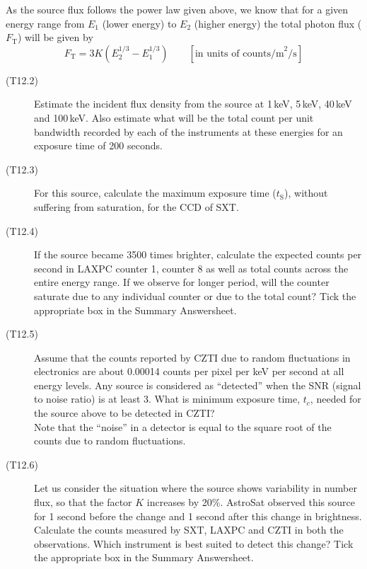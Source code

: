 As the source flux follows the power law given above, we know that for a given
energy range from $E_1$ (lower energy) to $E_2$ (higher energy) the total
photon flux ($F_{\mathrm{T}}$) will be given by
\[ F_{\mathrm{T}} = 3K\left(E_2^{1/3} - E_1^{1/3}\right) \qquad
   [\text{in units of counts/m}^2\text{/s}] \]

\begin{description}
\item[(T12.2)] Estimate the incident flux density from the source at 1\,keV,
  5\,keV, 40\,keV and 100\,keV. Also estimate what will be the total count per
  unit bandwidth recorded by each of the instruments at these energies for an
  exposure time of 200 seconds.
\item[(T12.3)] For this source, calculate the maximum exposure time
  ($t_{\mathrm{S}}$), without suffering from saturation, for the CCD of SXT.
\item[(T12.4)] If the source became 3500 times brighter, calculate the expected
  counts per second in LAXPC counter 1, counter 8 as well as total counts
  across the entire energy range. If we observe for longer period, will the
  counter saturate due to any individual counter or due to the total count?
  Tick the appropriate box in the Summary Answersheet.
\item[(T12.5)] Assume that the counts reported by CZTI due to random
  fluctuations in electronics are about 0.00014 counts per pixel per keV per
  second at all energy levels. Any source is considered as ``detected'' when
  the SNR (signal to noise ratio) is at least 3. What is minimum exposure time,
  $t_c$, needed for the source above to be detected in CZTI?\\
  Note that the ``noise'' in a detector is equal to the square root of the
  counts due to random fluctuations.
\item[(T12.6)] Let us consider the situation where the source shows variability
  in number flux, so that the factor $K$ increases by 20\%. AstroSat observed
  this source for 1 second before the change and 1 second after this change in
  brightness. Calculate the counts measured by SXT, LAXPC and CZTI in both the
  observations. Which instrument is best suited to detect this change? Tick the
  appropriate box in the Summary Answersheet.
\end{description}
